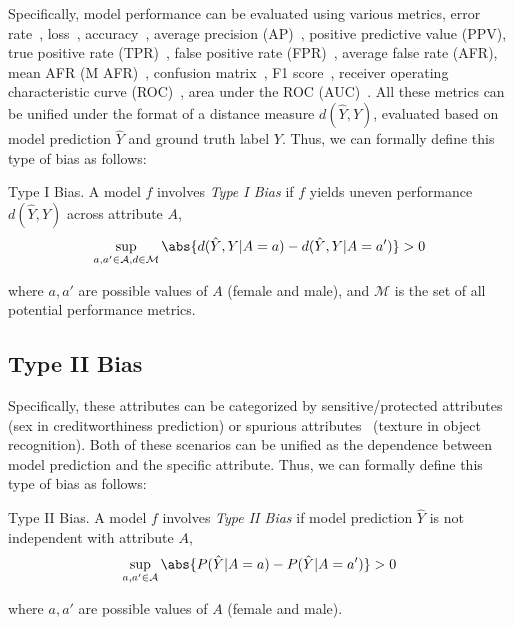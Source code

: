 Specifically, model performance can be evaluated using various metrics, \eg error rate~\cite{Timnit_sex_classification_PPB,fairnessgan_DP_difference_error_rate}, loss~\cite{representation_disparity}, accuracy~\cite{multiaccuracy}, average precision (AP)~\cite{DP_difference_fpr_GAN_debiasing}, positive predictive value (PPV), 
true positive rate (TPR)~\cite{pass,BR_Net_dataset_vs_task}, false positive rate (FPR)~\cite{FPR_Penalty_Loss}, average false rate (AFR), mean AFR (M AFR)~\cite{inclusivefacenet}, confusion matrix~\cite{DebFace}, F1 score~\cite{BR_Net_dataset_vs_task}, receiver operating characteristic curve (ROC)~\cite{RL_RBN, fairnessgan_DP_difference_error_rate, SAN, Asymmetric_Rejection_Loss,debias_balanced_AUCROC}, area under the ROC (AUC)~\cite{FlowSAN, DebFace, BR_Net_dataset_vs_task}.
All these metrics can be unified under the format of a distance measure $d(\hat{Y},Y)$, evaluated based on model prediction $\hat{Y}$ and ground truth label $Y$.
Thus, we can formally define this type of bias as follows:
\begin{definition}
    \label{def:Type_I_Bias}
Type I Bias. A model $f$ involves \emph{Type I Bias} if $f$ yields uneven performance $d(\hat{Y},Y)$ across attribute $A$,
\begin{align}
    \sup_{a,a'\in \mathcal{A}, d \in \mathcal{M}} \abs{d(\hat{Y},Y|A=a) - d(\hat{Y},Y|A=a')} > 0
\end{align}
\end{definition}
\noindent
where $a,a'$ are possible values of $A$ (\eg female and male), and $\mathcal{M}$ is the set of all potential performance metrics.






\subsection{Type II Bias}

Specifically, these attributes can be categorized by sensitive/protected attributes~\cite{Fairalm_DP_difference_false_positive_rate, GDP} (\eg sex in creditworthiness prediction) or spurious attributes~\cite{Group_DRO,JTT} (\eg texture in object recognition).
Both of these scenarios can be unified as the dependence between model prediction and the specific attribute.
Thus, we can formally define this type of bias as follows:
\begin{definition}
    \label{def:Type_II_Bias}
Type II Bias. A model $f$ involves \emph{Type II Bias} if model prediction $\hat{Y}$ is not independent with attribute $A$,
\begin{align}
\sup_{a,a' \in \mathcal{A}} \abs{P(\hat{Y}|A=a) - P(\hat{Y}|A=a')} > 0 
\end{align}
\end{definition}

\noindent
where $a,a'$ are possible values of $A$ (\eg female and male).


